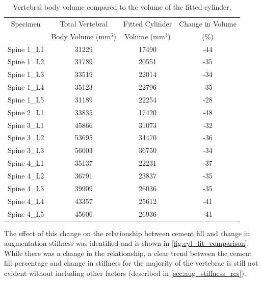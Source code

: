 \begin{table}[ht!]
\centering
  \caption{Vertebral body volume compared to the volume of the fitted
cylinder.}
	\label{tab:vertebrae_vol_cyl}
  \begin{tabular}{c |c|c|c}
	  Specimen & Total Vertebral  & Fitted Cylinder & Change in Volume\\ 
	  &Body Volume (mm$^3$)&Volume (mm$^3$) &(\%)\\ \hline \hline
	  Spine 1\_L1  & 31229 & 17490 & -44\\
	  Spine 1\_L2  & 31789 & 20551 & -35\\
	  Spine 1\_L3  & 33519 & 22014 & -34\\
	  Spine 1\_L4  & 35123 & 22796 & -35\\
	  Spine 1\_L5  & 31189 & 22254 & -28\\
	  Spine 2\_L1  & 33835 & 17420 & -48\\
	  Spine 3\_L1  & 45866 & 31073 & -32\\
	  Spine 3\_L2  & 53695 & 34470 & -36\\
	  Spine 3\_L3  & 56003 & 36750 & -34\\
	  Spine 4\_L1  & 35137 & 22231 & -37\\
	  Spine 4\_L2  & 36791 & 23837 & -35\\
	  Spine 4\_L3  & 39909 & 26036 & -35\\
	  Spine 4\_L4  & 43357 & 25612 & -41\\
	  Spine 4\_L5  & 45606 & 26936 & -41\\
	  \hline
  \end{tabular}

\end{table}

The effect of this change on the relationship between cement fill and change in
augmentation stiffness was identified and is shown in
\cref{fig:cyl_fit_comparison}.
While there was a change in the relationship, a clear trend between the cement
fill percentage and change in stiffness for the majority of the vertebrae is
still not evident without including other factors (described in
\cref{sec:aug_stiffness_res}).

